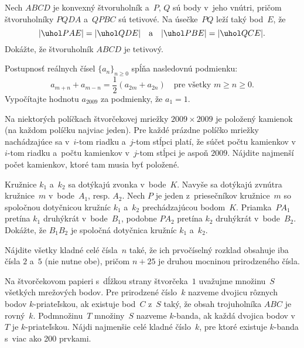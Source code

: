 {%
Nech $ABCD$ je konvexný štvoruholník a~$P$, $Q$ sú body v~jeho vnútri, pričom štvoruholníky $PQDA$ a~$QPBC$ sú tetivové. Na úsečke~$PQ$ leží taký bod~$E$, že
$$
|\uhol PAE|=|\uhol QDE|\quad\text{a}\quad |\uhol PBE|=|\uhol QCE|.
$$
Dokážte, že štvoruholník $ABCD$ je tetivový.
}

{%
Postupnosť reálnych čísel ${\{a_n\}}_{n\ge 0}$ spĺňa nasledovnú podmienku:
$$
a_{m+n}+a_{m-n}=\frac12(a_{2m}+a_{2n})\quad\text{pre všetky $m\ge n\ge 0$.}
$$
Vypočítajte hodnotu $a_{2009}$ za podmienky, že $a_1=1$.
}

{%
Na niektorých políčkach štvorčekovej mriežky $2009\times 2009$ je položený kamienok (na každom políčku najviac jeden). Pre každé prázdne políčko mriežky nachádzajúce sa v~$i$-tom riadku a~$j$-tom stĺpci platí, že súčet počtu kamienkov v~$i$-tom riadku a~počtu kamienkov v~$j$-tom stĺpci je aspoň $2009$. Nájdite najmenší počet kamienkov, ktoré tam musia byť položené.}

{%
Kružnice $k_1$ a~$k_2$ sa dotýkajú zvonka v~bode~$K$. Navyše sa dotýkajú zvnútra kružnice~$m$ v~bode~$A_1$, resp. $A_2$. Nech $P$ je jeden z~priesečníkov kružnice~$m$ so spoločnou dotyčnicou kružníc $k_1$ a~$k_2$ prechádzajúcou bodom~$K$. Priamka~$PA_1$ pretína $k_1$ druhýkrát v~bode~$B_1$, podobne $PA_2$ pretína $k_2$ druhýkrát v~bode~$B_2$. Dokážte, že $B_1B_2$ je spoločná dotyčnica kružníc $k_1$ a~$k_2$.}

{%
Nájdite všetky kladné celé čísla~$n$ také, že ich prvočíselný rozklad obsahuje iba čísla $2$ a~$5$ (nie nutne obe), pričom $n+25$ je druhou mocninou prirodzeného čísla.}

{%
Na štvorčekovom papieri s~dĺžkou strany štvorčeka~$1$ uvažujme množinu~$S$
všetkých mrežových bodov. Pre prirodzené číslo~$k$ nazveme dvojicu rôznych
bodov $k$-priateľskou, ak existuje bod~$C$ z~$S$ taký, že obsah
trojuholníka $ABC$ je rovný~$k$. Podmnožinu~$T$ množiny~$S$ nazveme $k$-banda,
ak každá dvojica bodov v~$T$ je $k$-priateľskou. Nájdi najmenšie celé
kladné číslo~$k$, pre ktoré existuje $k$-banda s~viac ako 200 prvkami.}

